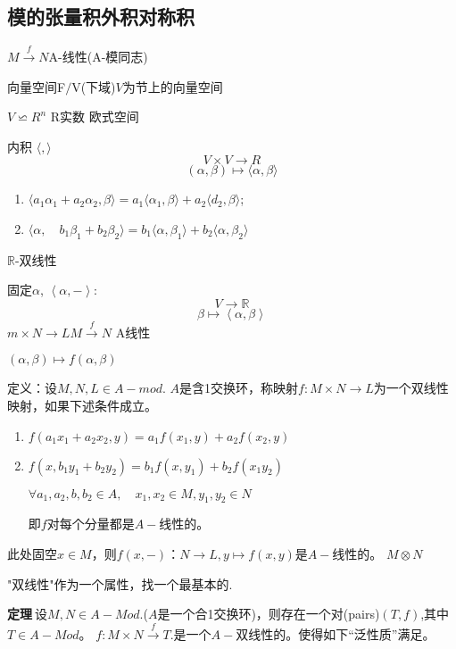 \documentclass[UTF8]{article}
\begin{document}
\subsection {模的张量积\qquad 外积\qquad  对称积}

$M \stackrel{f}{\rightarrow} N$\qquad  A-线性(A-模同志)

向量空间\quad F$\slash$V\quad  (下域)\quad  $V$为节上的向量空间

$V \backsimeq R^{n}$   R实数 欧式空间

内积 $\langle, \rangle$
$$V \times V  \longrightarrow R$$
$$(\alpha,\beta)\mapsto\langle\alpha, \beta\rangle$$
\begin{enumerate}
	\item $\langle a_{1} \alpha_{1}+a_{2} \alpha_{2}, \beta\rangle=a_{1}\langle\alpha_{1}, \beta\rangle+a_{2}\langle d_{2}, \beta\rangle$;
	\item $\langle\alpha, \quad b_{1} \beta_{1}+b_{2} \beta_{2}\rangle=b_{1}\langle\alpha, \beta_{1}\rangle+b_{2}\langle\alpha, \beta_{2}\rangle$
\end{enumerate}

$\mathbb{R}$-双线性

固定$\alpha$, $\left\langle\alpha,-\right\rangle$: $$V \rightarrow \mathbb{R}$$
$$\beta\mapsto\left\langle\alpha,\beta\right\rangle$$
$m \times N \rightarrow L$\qquad $M \stackrel{f}{\rightarrow} N$ A线性


$(\alpha, \beta)  \longmapsto f\left(\alpha, \beta\right)$


定义：设$M,N,L\in A-mod$. $A$是含1交换环，称映射$f:M \times N \rightarrow L$为一个双线性映射，如果下述条件成立。
\begin{enumerate}
	\item $f\left(a_{1} x_{1}+a_{2} x_{2}, y\right)=a_{1} f\left(x_{1}, y\right)+a_{2} f\left(x_{2}, y\right)$
	\item $f(x,b_1y_1+b_2y_2)=b_{1} f\left(x, y_{1}\right)+b_{2} f\left(x_{1} y_{2}\right)$
	
	$\forall a_{1}, a_{2}, b, b_{2} \in A, \quad x_{1}, x_{2}\in M ,y_{1}, y_{2} \in N$
	
	即$f$对每个分量都是$A-$线性的。
	
	
\end{enumerate}

此处固空$x \in M$，则$f(x,-)$：$N \rightarrow L,y \longmapsto f(x, y)$是$A-$线性的。
$M\otimes N$

"双线性"作为一个属性，找一个最基本的.

\textbf{定理}$\ $设$M,N \in A-M o d .$($A$是一个合1交换环)，则存在一个对(pairs)$(T,f)$,其中$T \in A-Mod$。
$f:M \times N \stackrel{f}{\longrightarrow} T .$是一个$A-$双线性的。使得如下“泛性质”满足。
\end{document}
